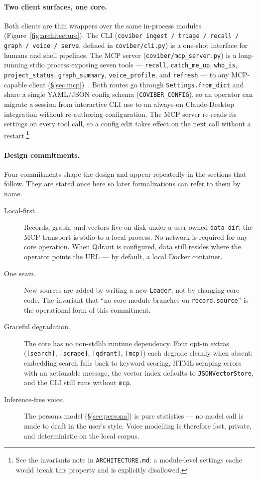 \paragraph{Two client surfaces, one core.}
Both clients are thin wrappers over the same in-process modules
(Figure~\ref{fig:architecture}). The CLI (\texttt{coviber ingest / triage /
recall / graph / voice / serve}, defined in \texttt{coviber/cli.py}) is a
one-shot interface for humans and shell pipelines. The MCP server
(\texttt{coviber/mcp\_server.py}) is a long-running stdio process exposing
seven tools --- \texttt{recall}, \texttt{catch\_me\_up}, \texttt{who\_is},
\texttt{project\_status}, \texttt{graph\_summary}, \texttt{voice\_profile},
and \texttt{refresh} --- to any MCP-capable client
(\S\ref{sec:mcp})~\cite{TODO-mcp-spec}. Both routes go through
\texttt{Settings.from\_dict} and share a single YAML/JSON config schema
(\texttt{COVIBER\_CONFIG}), so an operator can migrate a session from
interactive CLI use to an always-on Claude-Desktop integration without
re-authoring configuration. The MCP server re-reads its settings on every
tool call, so a config edit takes effect on the next call without a
restart.\footnote{See the invariants note in
\texttt{ARCHITECTURE.md}: a module-level settings cache would break this
property and is explicitly disallowed.}

\paragraph{Design commitments.}
Four commitments shape the design and appear repeatedly in the sections that
follow. They are stated once here so later formalizations can refer to them
by name.
\begin{description}
    \item[Local-first.] Records, graph, and vectors live on disk under a
    user-owned \texttt{data\_dir}; the MCP transport is stdio to a local
    process. No network is required for any core operation. When Qdrant is
    configured, data still resides where the operator points the URL --- by
    default, a local Docker container.
    \item[One seam.] New sources are added by writing a new \texttt{Loader},
    not by changing core code. The invariant that ``no core module branches
    on \texttt{record.source}'' is the operational form of this commitment.
    \item[Graceful degradation.] The core has no non-stdlib runtime
    dependency. Four opt-in extras
    (\texttt{[search]}, \texttt{[scrape]}, \texttt{[qdrant]},
    \texttt{[mcp]}) each degrade cleanly when absent: embedding search
    falls back to keyword scoring, HTML scraping errors with an
    actionable message, the vector index defaults to
    \texttt{JSONVectorStore}, and the CLI still runs without
    \texttt{mcp}.
    \item[Inference-free voice.] The persona model
    (\S\ref{sec:persona}) is pure statistics --- no model call is made
    to draft in the user's style. Voice modelling is therefore fast,
    private, and deterministic on the local corpus.
\end{description}

